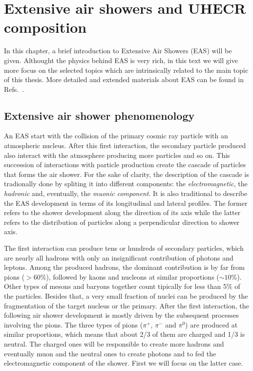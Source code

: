 \chapter[Extensive air showers and UHECR composition]{Extensive air showers and UHECR composition}
\label{sec:showers}


In this chapter, a brief introduction to Extensive Air Showers (EAS)
will be given. Althought the physics behind EAS is very rich,
in this text we will give more focus on the selected topics
which are intrinsically related to the main topic of this thesis.
More detailed and extended materials about EAS can be found
in Refs.~\cite{GaisserBook,GriederBook}.


\section{Extensive air shower phenomenology}
\label{sec:showers:phen}

An EAS start with the collision of the primary cosmic ray particle
with an atmospheric nucleus. After this first interaction, the secondary
particle produced also interact with the atmosphere producing more
particles and so on. This succession of interactions with particle production
create the cascade of particles that forms the air shower.
For the sake of clarity, the description of the cascade is tradionally
done by spliting it into different components: the \emph{electromagnetic},
the \emph{hadronic} and, eventually, the \emph{muonic component}. It is also traditional
to describe the EAS development in terms of its longitudinal and lateral profiles.
The former refers to the shower development along the direction of its axis
while the latter refers to the distribution of particles
along a perpendicular direction to shower axis.


The first interaction can produce tens or hundreds of
secondary particles, which are nearly all hadrons
with only an insignificant contribution of photons and leptons.
Among the produced hadrons, the dominant contribution is by far from pions ($>60\%$),
followed by kaons and nucleons at similar proportions ($\sim 10\%$). Other
types of mesons and baryons together count tipically for less than 5\% of
the particles. Besides that, a very small fraction of nuclei can be produced
by the fragmentation of the target nucleus or the primary.
After the first interaction, the following air shower development is mostly driven
by the subsequent processes involving the pions. The three types of pions ($\pi^+$, $\pi^-$ and $\pi^0$)
are produced at similar proportions, which means that about 2/3 of them are charged and
1/3 is neutral. The charged ones will be responsible to create more
hadrons and eventually muon and the neutral ones to create photons and
to fed the electromagnetic component of the shower.
First we will focus on the latter case.

